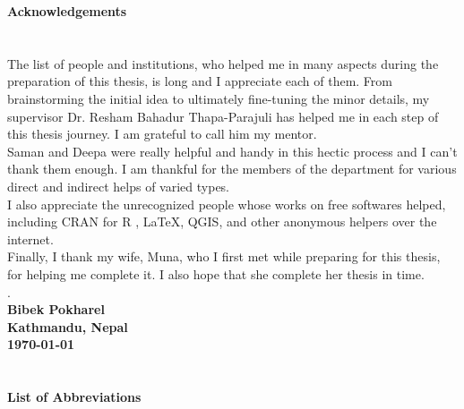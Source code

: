 \newpage
\begin{center}
\textbf{\large Acknowledgements}
\end{center}
\section*{}

\vspace{-10mm} 
The list of people and institutions, who helped me in many aspects during the preparation of this thesis, is long and  I appreciate each of them. From brainstorming the initial idea to ultimately fine-tuning the minor details, my supervisor Dr. Resham Bahadur Thapa-Parajuli has helped me in each step of this thesis journey. I am grateful to call him my mentor. \\
Saman and Deepa were really helpful and handy in this hectic process and I can't thank them enough. I am thankful for the members of the department for various direct and indirect helps of varied types.\\
I also appreciate the unrecognized people whose works on free softwares helped, including CRAN for R , \LaTeX{}, QGIS, and other anonymous helpers over the internet.\\
Finally, I thank my wife, Muna, who I first met while preparing for this thesis, for helping me complete it. I also hope that she complete her thesis in time.\\
.\vspace{5mm}\\ 
\textbf{Bibek Pokharel}\\
\textbf{Kathmandu, Nepal}\\
\textbf{\today}

\newpage
\begin{center}
\tableofcontents
\end{center}

\newpage
\begin{center}
\listoftables

\section*{}


\listoffigures
\section*{}


\newpage
\textbf{\large List of Abbreviations}
\end{center}
